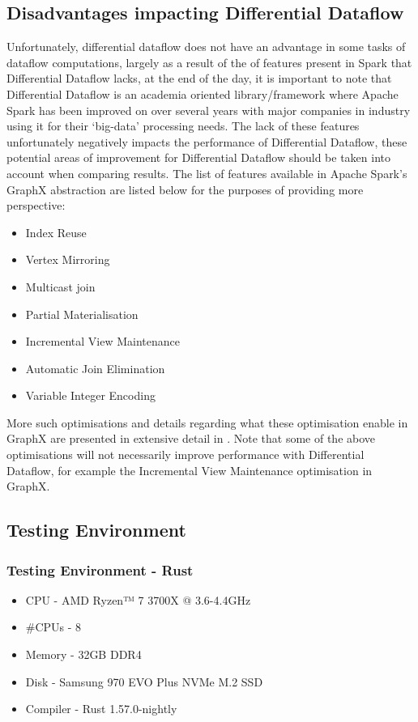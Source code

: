\subsection{Disadvantages impacting Differential Dataflow}
Unfortunately, differential dataflow does not have an advantage in some tasks of dataflow computations, largely as a result of the of features present in Spark that Differential Dataflow lacks, at the end of the day, it is important to note that Differential Dataflow is an academia oriented library/framework where Apache Spark has been improved on over several years with major companies in industry using it for their `big-data' processing needs. The lack of these features unfortunately negatively impacts the performance of Differential Dataflow, these potential areas of improvement for Differential Dataflow should be taken into account when comparing results. The list of features available in Apache Spark's GraphX abstraction are listed below for the purposes of providing more perspective:
\begin{itemize}
    \label{items:disadvantages}
    \item Index Reuse
    \item Vertex Mirroring
    \item Multicast join
    \item Partial Materialisation
    \item Incremental View Maintenance
    \item Automatic Join Elimination
    \item Variable Integer Encoding
\end{itemize}
More such optimisations and details regarding what these optimisation enable in GraphX are presented in extensive detail in \cite{xin2018go}. Note that some of the above optimisations will not necessarily improve performance with Differential Dataflow, for example the Incremental View Maintenance optimisation in GraphX. 

\subsection{Testing Environment}
\subsubsection{Testing Environment - Rust}
\begin{itemize}
    \item CPU - AMD Ryzen™ 7 3700X @ 3.6-4.4GHz
    \item \#CPUs - 8
    \item Memory - 32GB DDR4
    \item Disk - Samsung 970 EVO Plus NVMe M.2 SSD
    \item Compiler - Rust 1.57.0-nightly
\end{itemize}
